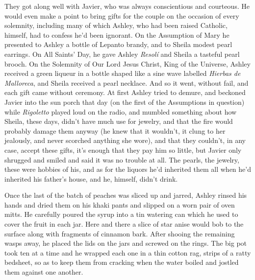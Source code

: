 \documentclass[
]{article}
\begin{document}
They got along well with Javier, who was always conscientious and
courteous. He would even make a point to bring gifts for the couple on
the occasion of every solemnity, including many of which Ashley, who had
been raised Catholic, himself, had to confess he'd been ignorant. On the
Assumption of Mary he presented to Ashley a bottle of Lepanto brandy,
and to Sheila modest pearl earrings. On All Saints' Day, he gave Ashley
\emph{Resolí} and Sheila a tasteful pearl brooch. On the Solemnity of
Our Lord Jesus Christ, King of the Universe, Ashley received a green
liqueur in a bottle shaped like a sine wave labelled \emph{Hierbas de
Malloreca}, and Sheila received a pearl necklace. And so it went,
without fail, and each gift came without ceremony. At first Ashley tried
to demure, and beckoned Javier into the sun porch that day (on the first
of the Assumptions in question) while \emph{Rigoletto} played loud on
the radio, and mumbled something about how Sheila, these days, didn't
have much use for jewelry, and that the fire would probably damage them
anyway (he knew that it wouldn't, it clung to her jealously, and never
scorched anything she wore), and that they couldn't, in any case, accept
these gifts, it's enough that they pay him so little, but Javier only
shrugged and smiled and said it was no trouble at all. The pearls, the
jewelry, these were hobbies of his, and as for the liquors he'd
inherited them all when he'd inherited his father's house, and he,
himself, didn't drink.

Once the last of the batch of peaches was sliced up and jarred, Ashley
rinsed his hands and dried them on his khaki pants and slipped on a worn
pair of oven mitts. He carefully poured the syrup into a tin watering
can which he used to cover the fruit in each jar. Here and there a slice
of star anise would bob to the surface along with fragments of cinnamon
bark. After shooing the remaining wasps away, he placed the lids on the
jars and screwed on the rings. The big pot took ten at a time and he
wrapped each one in a thin cotton rag, strips of a ratty bedsheet, so as
to keep them from cracking when the water boiled and jostled them
against one another.
\end{document}
